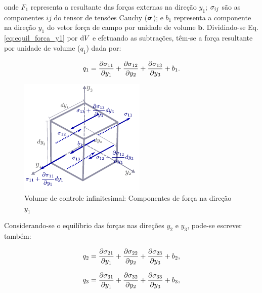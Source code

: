 \documentclass[tese_patricia]{subfiles}%
\begin{document}
\noindent onde $F_1$ representa a resultante das forças externas na direção $y_1$; $\sigma_{ij}$ são as componentes $ij$ do tensor de tensões Cauchy ($\boldsymbol{\sigma}$); e $b_1$ representa a componente na direção $y_1$ do vetor força de campo por unidade de volume $\mathbf{b}$. Dividindo-se Eq. \ref{eq:equil_forca_y1} por $\mathrm{d} V$ e efetuando as subtrações, têm-se a força resultante por unidade de volume ($q_1$) dada por:

\begin{align}
		q_1 =\frac{\partial \sigma_{11}}{\partial y_1} + \frac{\partial \sigma_{12}}{\partial y_2} + \frac{\partial \sigma_{13}}{\partial y_3} + b_{1}.
\end{align}	

\begin{figure}[htb!]
	\centering 
	\includegraphics[scale=1.5,trim=0cm 0.0cm 0cm 0.0cm, clip=true]{Imagens/Cap2/volInf_tensao.pdf}	
	\caption{Volume de controle infinitesimal: Componentes de força na direção $y_1$}
	\label{fig:volInf_tensao}
\end{figure}

Considerando-se o equilíbrio das forças nas direções $y_2$ e $y_3$, pode-se escrever também:

\begin{align}
	q_2 =\frac{\partial \sigma_{21}}{\partial y_1} + \frac{\partial \sigma_{22}}{\partial y_2} + \frac{\partial \sigma_{23}}{\partial y_3} + b_{2},
\end{align}	

\begin{align}
	q_3 =\frac{\partial \sigma_{31}}{\partial y_1} + \frac{\partial \sigma_{32}}{\partial y_2} + \frac{\partial \sigma_{33}}{\partial y_3} + b_{3},
\end{align}
\end{document}
